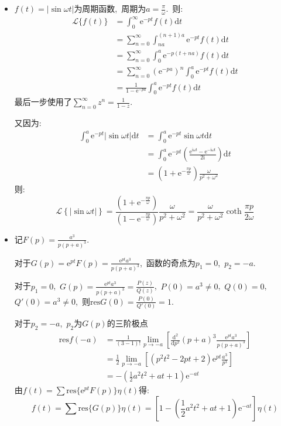\documentclass[a4paper,fontset=windows]{ctexart}
\begin{document}
\begin{itemize}
\bigskip
\item[3.(1)]
$f(t)=|\sin\omega t|$为周期函数,\ 周期为$a=\frac{\pi}{\omega}$.\ 则:
\begin{align*}
\mathscr{L}\{f(t)\}
&=\int_{0}^{\infty}\mathrm{e}^{-pt}f(t)\mathrm{d}t \\
&=\sum_{n=0}^{\infty}\int_{na}^{(n+1)a}\mathrm{e}^{-pt}f(t)\mathrm{d}t \\
&=\sum_{n=0}^{\infty}\int_{0}^{a}\mathrm{e}^{-p(t+na)}f(t)\mathrm{d}t \\
&=\sum_{n=0}^{\infty}\left(\mathrm{e}^{-pa}\right)^{n}\int_{0}^{a}\mathrm{e}^{-pt}f(t)\mathrm{d}t \\
&=\frac{1}{1-\mathrm{e}^{-pa}}\int_{0}^{a}\mathrm{e}^{-pt}f(t)\mathrm{d}t
\end{align*}
最后一步使用了$\sum_{n=0}^{\infty}z^n=\frac{1}{1-z}$.

又因为:
\begin{align*}
\int_{0}^{a}\mathrm{e}^{-pt}|\sin\omega t|\mathrm{d}t
&=\int_{0}^{a}\mathrm{e}^{-pt}\sin\omega t\mathrm{d}t \\
&=\int_{0}^{a}\mathrm{e}^{-pt}\left(\frac{\mathrm{e}^{\mathrm{i}\omega t}-\mathrm{e}^{-\mathrm{i}\omega t}}{2\mathrm{i}}\right)\mathrm{d}t \\
&=(1+\mathrm{e}^{-\frac{\pi p}{\omega}})\frac{\omega}{p^2+\omega^2}
\end{align*}
则:
\[
\mathscr{L}\left\lbrace|\sin\omega t|\right\rbrace 
=\frac{(1+\mathrm{e}^{-\frac{\pi p}{\omega}})}{(1-\mathrm{e}^{-\frac{\pi p}{\omega}})}\frac{\omega}{p^2+\omega^2}
=\frac{\omega}{p^2+\omega^2}\coth\frac{\pi p}{2\omega}
\]

\bigskip
\item[4.(1)]
记$F(p)=\frac{a^3}{p(p+a)^3}$.

对于$G(p)=\mathrm{e}^{pt}F(p)=\frac{\mathrm{e}^{pt}a^3}{p(p+a)^3}$,\ 函数的奇点为$p_1=0$,\ $p_2=-a$.

对于$p_1=0$,\ $G(p)=\frac{\mathrm{e}^{pt}a^3}{p(p+a)^3}=\frac{P(z)}{Q(z)}$,\ $P(0)=a^3\neq0$,\ $Q(0)=0$,\ $Q'(0)=a^3\neq0$,\ 则$\mathrm{res}G(0)=\frac{P(0)}{Q'(0)}=1$.

对于$p_2=-a$,\ $p_2$为$G(p)$的三阶极点
\begin{align*}
\mathrm{res}f(-a)
&=\frac{1}{(3-1)!}{\lim_{p\to -a}}\left[\frac{\mathrm{d}^2}{\mathrm{d}p^2}(p+a)^3\frac{\mathrm{e}^{pt}a^3}{p(p+a)^3}\right] \\
&=\frac{1}{2}{\lim_{p\to -a}}\left[\left(p^2t^2-2pt+2\right)\mathrm{e}^{pt}\frac{a^3}{p^3}\right] \\
&=-\left(\frac{1}{2}a^2t^2+at+1\right)\mathrm{e}^{-at}
\end{align*}
由$f(t)=\sum\mathrm{res}\{\mathrm{e}^{pt}F(p)\}\eta(t)$得:
\[
f(t)
=\sum\mathrm{res}\{G(p)\}\eta(t)
=\left[1-\left(\frac{1}{2}a^2t^2+at+1\right)\mathrm{e}^{-at}\right]\eta(t)
\]


\end{itemize}
\end{document}
